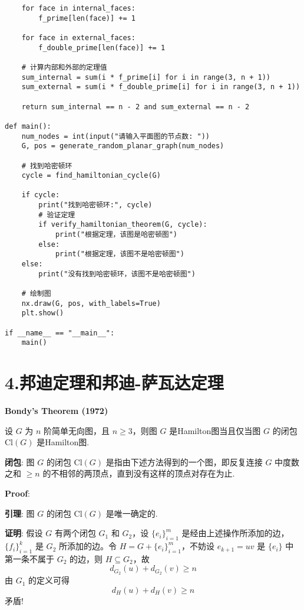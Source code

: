 \documentclass{article}
\begin{document}
\begin{lstlisting}
    for face in internal_faces:
        f_prime[len(face)] += 1

    for face in external_faces:
        f_double_prime[len(face)] += 1

    # 计算内部和外部的定理值
    sum_internal = sum(i * f_prime[i] for i in range(3, n + 1))
    sum_external = sum(i * f_double_prime[i] for i in range(3, n + 1))

    return sum_internal == n - 2 and sum_external == n - 2

def main():
    num_nodes = int(input("请输入平面图的节点数: "))
    G, pos = generate_random_planar_graph(num_nodes)

    # 找到哈密顿环
    cycle = find_hamiltonian_cycle(G)

    if cycle:
        print("找到哈密顿环:", cycle)
        # 验证定理
        if verify_hamiltonian_theorem(G, cycle):
            print("根据定理，该图是哈密顿图")
        else:
            print("根据定理，该图不是哈密顿图")
    else:
        print("没有找到哈密顿环，该图不是哈密顿图")

    # 绘制图
    nx.draw(G, pos, with_labels=True)
    plt.show()

if __name__ == "__main__":
    main()
\end{lstlisting}
\section*{4.邦迪定理和邦迪-萨瓦达定理}
\textbf{Bondy's Theorem (1972)}

设 \( G \) 为 \( n \) 阶简单无向图，且 \( n \geq 3 \)，则图 \( G \) 是Hamilton图当且仅当图 \( G \) 的闭包 \(\mathrm{Cl}(G)\) 是Hamilton图.

\textbf{闭包}: 图 \( G \) 的闭包 \(\mathrm{Cl}(G)\) 是指由下述方法得到的一个图，即反复连接 \( G \) 中度数之和 \(\geq n\) 的不相邻的两顶点，直到没有这样的顶点对存在为止.

\textbf{Proof}:

\textbf{引理}: 图 \( G \) 的闭包 \(\mathrm{Cl}(G)\) 是唯一确定的.

\textbf{证明}: 假设 \( G \) 有两个闭包 \( G_{1} \) 和 \( G_{2} \)，设 \(\{e_{i}\}_{i=1}^{m}\) 是经由上述操作所添加的边， \(\{f_{i}\}_{i=1}^{k}\) 是 \( G_{2} \) 所添加的边。令 \( H = G + \{e_{i}\}_{i=1}^{m}\)，不妨设 \( e_{k+1} = uv \) 是 \(\{e_{i}\}\) 中第一条不属于 \( G_{2} \) 的边，则 \( H \subseteq G_{2} \)，故
\[ 
d_{G_{2}}(u) + d_{G_{2}}(v) \geq n 
\]
由 \( G_{1} \) 的定义可得
\[ 
d_{H}(u) + d_{H}(v) \geq n 
\]
矛盾!
\end{document}
